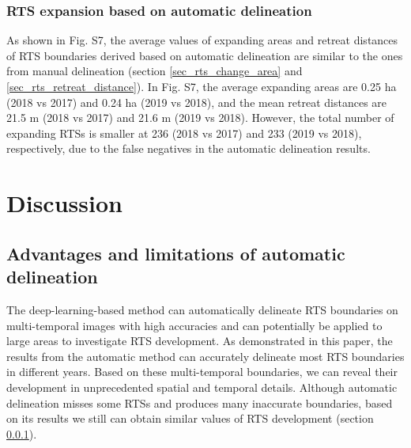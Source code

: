 \documentclass[authoryear,preprint,review,12pt]{elsarticle}
\begin{document}
 


\subsubsection{RTS expansion based on automatic delineation}
\label{sec_rts_change_auto_mapping}

As shown in Fig. S7, the average values of expanding areas and retreat distances of RTS boundaries derived based on automatic delineation are similar to the ones from manual delineation (section \ref{sec_rts_change_area} and \ref{sec_rts_retreat_distance}).
In Fig. S7, the average expanding areas are 0.25 ha (2018 vs 2017) and 0.24 ha (2019 vs 2018), and the mean retreat distances are 21.5 m (2018 vs 2017)  and 21.6 m (2019 vs 2018). 
However, the total number of expanding RTSs is smaller at 236 (2018 vs 2017) and 233 (2019 vs 2018), respectively, due to the false negatives in the automatic delineation results.

 

\section{Discussion}
\label{sec_discussion}

\subsection{Advantages and limitations of automatic delineation}
\label{sec_diss_mapping_rts_multi_images}

The deep-learning-based method can automatically delineate RTS boundaries on multi-temporal images with high accuracies and can potentially be applied to large areas to investigate RTS development. 
As demonstrated in this paper, the results from the automatic method can accurately delineate most RTS boundaries in different years.
Based on these multi-temporal boundaries, we can reveal their development in unprecedented spatial and temporal details. 
Although automatic delineation misses some RTSs and produces many inaccurate boundaries, based on its results we still can obtain similar values of RTS development (section \ref{sec_rts_change_auto_mapping}). 
\end{document}
